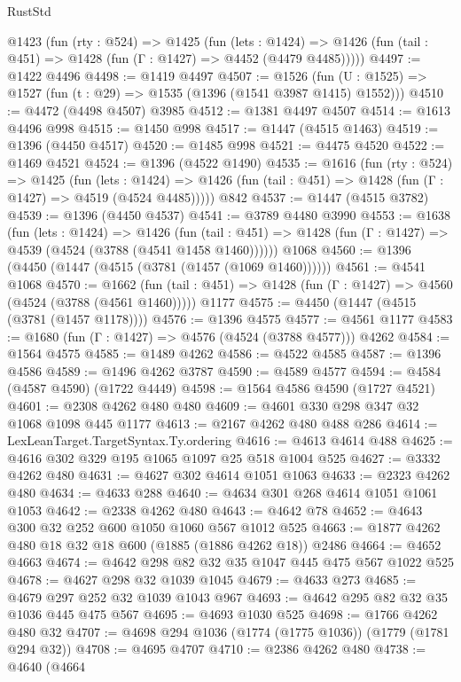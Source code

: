 \begin{lexlean}{RustStd}
\begin{coremodule}
  @1423
    (fun (rty : @524) =>
    @1425
      (fun (lets : @1424) =>
      @1426 (fun (tail : @451) => @1428 (fun (Γ : @1427) => @4452 (@4479 @4485)))))
@4497 := @1422 @4496
@4498 := @1419 @4497
@4507 := @1526 (fun (U : @1525) => @1527 (fun (t : @29) => @1535 (@1396 (@1541 @3987 @1415) @1552)))
@4510 := @4472 (@4498 @4507) @3985
@4512 := @1381 @4497 @4507
@4514 := @1613 @4496 @998
@4515 := @1450 @998
@4517 := @1447 (@4515 @1463)
@4519 := @1396 (@4450 @4517)
@4520 := @1485 @998
@4521 := @4475 @4520
@4522 := @1469 @4521
@4524 := @1396 (@4522 @1490)
@4535 := @1616
    (fun (rty : @524) =>
    @1425
      (fun (lets : @1424) =>
      @1426 (fun (tail : @451) => @1428 (fun (Γ : @1427) => @4519 (@4524 @4485)))))
    @842
@4537 := @1447 (@4515 @3782)
@4539 := @1396 (@4450 @4537)
@4541 := @3789 @4480 @3990
@4553 := @1638
    (fun (lets : @1424) =>
    @1426
      (fun (tail : @451) => @1428 (fun (Γ : @1427) => @4539 (@4524 (@3788 (@4541 @1458 @1460))))))
    @1068
@4560 := @1396 (@4450 (@1447 (@4515 (@3781 (@1457 (@1069 @1460))))))
@4561 := @4541 @1068
@4570 := @1662
    (fun (tail : @451) => @1428 (fun (Γ : @1427) => @4560 (@4524 (@3788 (@4561 @1460)))))
    @1177
@4575 := @4450 (@1447 (@4515 (@3781 (@1457 @1178))))
@4576 := @1396 @4575
@4577 := @4561 @1177
@4583 := @1680 (fun (Γ : @1427) => @4576 (@4524 (@3788 @4577))) @4262
@4584 := @1564 @4575
@4585 := @1489 @4262
@4586 := @4522 @4585
@4587 := @1396 @4586
@4589 := @1496 @4262 @3787
@4590 := @4589 @4577
@4594 := @4584 (@4587 @4590) (@1722 @4449)
@4598 := @1564 @4586 @4590 (@1727 @4521)
@4601 := @2308 @4262 @480 @480
@4609 := @4601 @330 @298 @347 @32 @1068 @1098 @445 @1177
@4613 := @2167 @4262 @480 @488 @286
@4614 := LexLeanTarget.TargetSyntax.Ty.ordering
@4616 := @4613 @4614 @488
@4625 := @4616 @302 @329 @195 @1065 @1097 @25 @518 @1004 @525
@4627 := @3332 @4262 @480
@4631 := @4627 @302 @4614 @1051 @1063
@4633 := @2323 @4262 @480
@4634 := @4633 @288
@4640 := @4634 @301 @268 @4614 @1051 @1061 @1053
@4642 := @2338 @4262 @480
@4643 := @4642 @78
@4652 := @4643 @300 @32 @252 @600 @1050 @1060 @567 @1012 @525
@4663 := @1877 @4262 @480 @18 @32 @18 @600 (@1885 (@1886 @4262 @18)) @2486
@4664 := @4652 @4663
@4674 := @4642 @298 @82 @32 @35 @1047 @445 @475 @567 @1022 @525
@4678 := @4627 @298 @32 @1039 @1045
@4679 := @4633 @273
@4685 := @4679 @297 @252 @32 @1039 @1043 @967
@4693 := @4642 @295 @82 @32 @35 @1036 @445 @475 @567
@4695 := @4693 @1030 @525
@4698 := @1766 @4262 @480 @32
@4707 := @4698 @294 @1036 (@1774 (@1775 @1036)) (@1779 (@1781 @294 @32))
@4708 := @4695 @4707
@4710 := @2386 @4262 @480
@4738 := @4640
    (@4664

\end{coremodule}
\end{lexlean}
